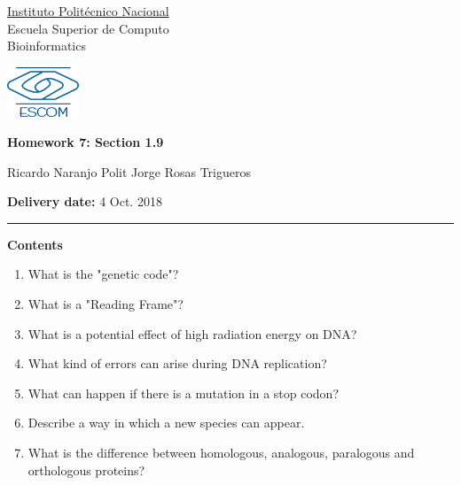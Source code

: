\documentclass[12pt,letterpaper]{article}
\begin{document}
\pagestyle{plain}

\begin{minipage}{0.45\textwidth}

\begin{flushleft}
\underline{Instituto Politécnico Nacional}\\
Escuela Superior de Computo\\
Bioinformatics
\end{flushleft}

\end{minipage}
\hfill
\begin{minipage}{0.45\textwidth}

\begin{flushright}\vspace{-5mm}
\includegraphics[height=1.5cm]{logo.png}
\end{flushright}

\end{minipage}
 
\begin{center}
\textbf{Homework 7: Section 1.9}\\
\end{center}
Ricardo Naranjo Polit \hfill Jorge Rosas Trigueros

\begin{center}
\textbf{Delivery date:} 4 Oct. 2018
\end{center}

 
\rule{\linewidth}{0.1mm}

\bigskip
\textbf{\large{Contents}}
\\

\begin{enumerate}
\item What is the "genetic code"?
\item What is a "Reading Frame"?
\item What is a potential effect of high radiation energy on DNA?
\item What kind of errors can arise during DNA replication?
\item What can happen if there is a mutation in a stop codon?
\item Describe a way in which a new species can appear.
\item What is the difference between homologous, analogous, paralogous and orthologous proteins?
\end{enumerate}
\end{document}
